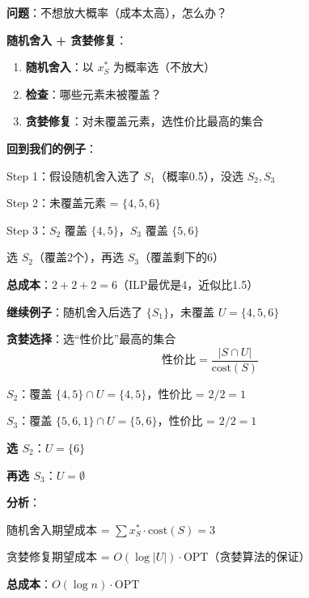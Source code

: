 \documentclass[12pt, a4paper]{ctexart}
\begin{document}
\begin{blackboard}

\textbf{问题}：不想放大概率（成本太高），怎么办？

\textbf{随机舍入 + 贪婪修复}：

\begin{enumerate}
    \item \textbf{随机舍入}：以 $x_S^*$ 为概率选（不放大）
    \item \textbf{检查}：哪些元素未被覆盖？
    \item \textbf{贪婪修复}：对未覆盖元素，选性价比最高的集合
\end{enumerate}

\textbf{回到我们的例子}：

Step 1：假设随机舍入选了 $S_1$（概率0.5），没选 $S_2, S_3$

Step 2：未覆盖元素 = $\{4, 5, 6\}$

Step 3：$S_2$ 覆盖 $\{4, 5\}$，$S_3$ 覆盖 $\{5, 6\}$

选 $S_2$（覆盖2个），再选 $S_3$（覆盖剩下的6）

\textbf{总成本}：$2 + 2 + 2 = 6$（ILP最优是4，近似比1.5）

\end{blackboard}

\begin{blackboard}

\textbf{继续例子}：随机舍入后选了 $\{S_1\}$，未覆盖 $U = \{4, 5, 6\}$

\textbf{贪婪选择}：选``性价比''最高的集合
\[
\text{性价比} = \frac{|S \cap U|}{\text{cost}(S)}
\]

$S_2$：覆盖 $\{4, 5\} \cap U = \{4, 5\}$，性价比 = $2/2 = 1$

$S_3$：覆盖 $\{5, 6, 1\} \cap U = \{5, 6\}$，性价比 = $2/2 = 1$

\textbf{选 $S_2$}：$U = \{6\}$

\textbf{再选 $S_3$}：$U = \emptyset$

\textbf{分析}：

随机舍入期望成本 = $\sum x_S^* \cdot \text{cost}(S) = 3$

贪婪修复期望成本 = $O(\log |U|) \cdot \text{OPT}$（贪婪算法的保证）

\textbf{总成本}：$O(\log n) \cdot \text{OPT}$

\end{blackboard}
\end{document}
